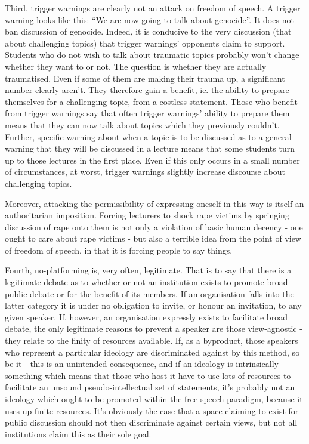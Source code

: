 \documentclass[10pt,a4paper,twoside]{article}
\begin{document}
\begin{multicols}{2}
Third, trigger warnings are clearly not an attack on freedom of speech.
A trigger warning looks like this: ``We are now going to talk about
genocide''. It does not ban discussion of genocide. Indeed, it is
conducive to the very discussion (that about challenging topics) that
trigger warnings' opponents claim to support. Students who do not wish
to talk about traumatic topics probably won't change whether they want
to or not. The question is whether they are actually traumatised. Even
if some of them are making their trauma up, a significant number clearly
aren't. They therefore gain a benefit, ie. the ability to prepare
themselves for a challenging topic, from a costless statement. Those who
benefit from trigger warnings say that often trigger warnings' ability
to prepare them means that they can now talk about topics which they
previously couldn't. Further, specific warning about when a topic is to
be discussed as to a general warning that they will be discussed in a
lecture means that some students turn up to those lectures in the first
place. Even if this only occurs in a small number of circumstances, at
worst, trigger warnings slightly increase discourse about challenging
topics.

Moreover, attacking the permissibility of expressing oneself in this way
is itself an authoritarian imposition. Forcing lecturers to shock rape
victims by springing discussion of rape onto them is not only a
violation of basic human decency - one ought to care about rape victims
- but also a terrible idea from the point of view of freedom of speech,
in that it is forcing people to say things.

Fourth, no-platforming is, very often, legitimate. That is to say that
there is a legitimate debate as to whether or not an institution exists
to promote broad public debate or for the benefit of its members. If an
organisation falls into the latter category it is under no obligation to
invite, or honour an invitation, to any given speaker. If, however, an
organisation expressly exists to facilitate broad debate, the only
legitimate reasons to prevent a speaker are those view-agnostic - they
relate to the finity of resources available. If, as a byproduct, those
speakers who represent a particular ideology are discriminated against
by this method, so be it - this is an unintended consequence, and if an
ideology is intrinsically something which means that those who host it
have to use lots of resources to facilitate an unsound
pseudo-intellectual set of statements, it's probably not an ideology
which ought to be promoted within the free speech paradigm, because it
uses up finite resources. It's obviously the case that a space claiming
to exist for public discussion should not then discriminate against
certain views, but not all institutions claim this as their sole goal.


\end{multicols}
\end{document}
